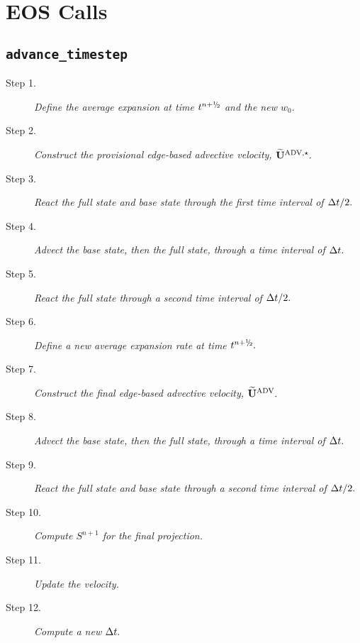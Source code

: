 \section{EOS Calls}
\subsection{{\tt advance\_timestep}}
\begin{description}
\item[Step 1.] {\em Define the average expansion at time $t^\nph$ and the new $w_0.$}\\

\item[Step 2.] {\em Construct the provisional edge-based advective velocity, $\widetilde{\mathbf{U}}^{\mathrm{ADV},\star}.$}\\

\item[Step 3.] {\em React the full state and base state through the first time interval 
of $\Delta t/2.$}\\

\item[Step 4.] {\em Advect the base state, then the full state, through a time interval 
of $\Delta t.$}\\

\item[Step 5.] {\em React the full state through a second time interval of $\Delta t/2.$}\\

\item[Step 6.] {\em Define a new average expansion rate at time $t^\nph.$}\\

\item[Step 7.] {\em Construct the final edge-based advective velocity, $\widetilde{\mathbf{U}}^{\mathrm{ADV}}.$}\\

\item[Step 8.] {\em Advect the base state, then the full state, through a time interval 
of $\Delta t.$}\\

\item[Step 9.] {\em React the full state and base state through a second time interval 
of $\Delta t/2.$}\\

\item[Step 10.] {\em Compute $S^{n+1}$ for the final projection.}\\

\item[Step 11.] {\em Update the velocity.}\\

\item[Step 12.] {\em Compute a new $\Delta t.$}\\

\end{description}
